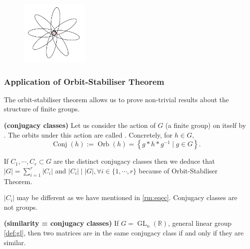 \documentclass{article}
\newcommand{\bfs}[1]{\textbf{({#1}) }}
\newcommand{\GL}{\operatorname{GL}}
\begin{document}
\begin{figure}[h]
\centering
\includegraphics[width=0.3\textwidth]{Figs/1.png}
\end{figure}
\subsubsection{Application of Orbit-Stabiliser Theorem}

The orbit-stabiliser theorem allows us to prove non-trivial results about the structure of finite groups. 

\begin{exma}{\bfs{conjugacy classes}}
Let us consider the action of $G$ (a finite group) on itself by . The orbits under this action are called . Concretely, for $h \in G,$ $$\operatorname{Conj}(h):=\operatorname{Orb}(h)=\left\{g * h * g^{-1} \mid g \in G\right\}.$$

If $C_{1}, \cdots, C_{r} \subset G$ are the
distinct conjugacy classes then we deduce that $|G|=\sum_{i=1}^{r}\left|C_{i}\right|$ and $\left|C_{i}\right|\mid | G |,\forall i \in\{1, \cdots, r\}$ because of Orbit-Stabiliser Theorem.
\end{exma}
\begin{rema}
$|C_i|$ may be different as we have mentioned in \cref{rm:eqec}. Conjugacy classes are not groups.
\end{rema}
\begin{exma}{\bfs{similarity = conjugacy classes}}\label{ex:odnmfv}
If $G=\GL_{n}(\mathbb{R})$, general linear group \cref{def:gl}, then two matrices are in the same conjugacy class if and only if they are similar.
\end{exma}
\end{document}
